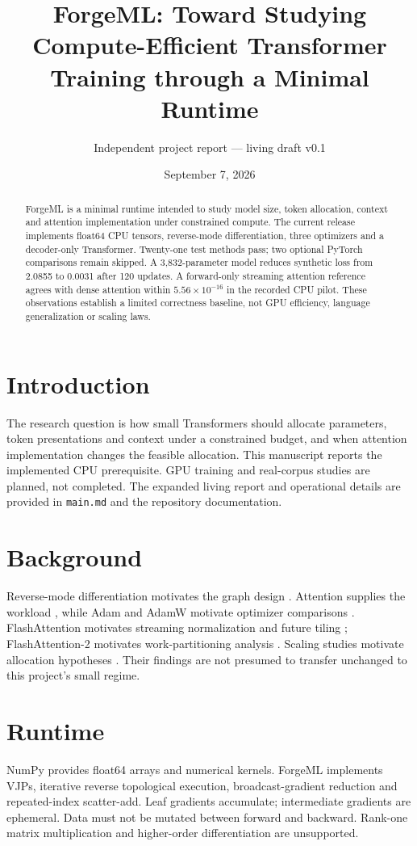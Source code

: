 \documentclass[11pt]{article}
\title{ForgeML: Toward Studying Compute-Efficient Transformer Training through a Minimal Runtime}
\author{Independent project report --- living draft v0.1}
\date{September 7, 2026}
\begin{document}
\maketitle
\begin{abstract}
ForgeML is a minimal runtime intended to study model size, token allocation, context and attention implementation under constrained compute. The current release implements float64 CPU tensors, reverse-mode differentiation, three optimizers and a decoder-only Transformer. Twenty-one test methods pass; two optional PyTorch comparisons remain skipped. A 3,832-parameter model reduces synthetic loss from 2.0855 to 0.0031 after 120 updates. A forward-only streaming attention reference agrees with dense attention within $5.56\times10^{-16}$ in the recorded CPU pilot. These observations establish a limited correctness baseline, not GPU efficiency, language generalization or scaling laws.
\end{abstract}
\section{Introduction}
The research question is how small Transformers should allocate parameters, token presentations and context under a constrained budget, and when attention implementation changes the feasible allocation. This manuscript reports the implemented CPU prerequisite. GPU training and real-corpus studies are planned, not completed. The expanded living report and operational details are provided in \texttt{main.md} and the repository documentation.
\section{Background}
Reverse-mode differentiation motivates the graph design \cite{baydin}. Attention supplies the workload \cite{vaswani}, while Adam and AdamW motivate optimizer comparisons \cite{adam,adamw}. FlashAttention motivates streaming normalization and future tiling \cite{flash}; FlashAttention-2 motivates work-partitioning analysis \cite{flash2}. Scaling studies motivate allocation hypotheses \cite{kaplan,hoffmann}. Their findings are not presumed to transfer unchanged to this project's small regime.
\section{Runtime}
NumPy provides float64 arrays and numerical kernels. ForgeML implements VJPs, iterative reverse topological execution, broadcast-gradient reduction and repeated-index scatter-add. Leaf gradients accumulate; intermediate gradients are ephemeral. Data must not be mutated between forward and backward. Rank-one matrix multiplication and higher-order differentiation are unsupported.
\end{document}
